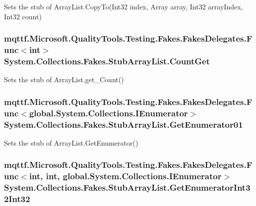 Sets the stub of Array\-List.\-Copy\-To(\-Int32 index, Array array, Int32 array\-Index, Int32 count)

\hypertarget{class_system_1_1_collections_1_1_fakes_1_1_stub_array_list_abc83a079c0d4b0bb23eccc981499f3ba}{
\subsubsection[{Count\-Get}]{\setlength{\rightskip}{0pt plus 5cm}mqttf.\-Microsoft.\-Quality\-Tools.\-Testing.\-Fakes.\-Fakes\-Delegates.\-Func$<$int$>$ System.\-Collections.\-Fakes.\-Stub\-Array\-List.\-Count\-Get}}\label{class_system_1_1_collections_1_1_fakes_1_1_stub_array_list_abc83a079c0d4b0bb23eccc981499f3ba}


Sets the stub of Array\-List.\-get\-\_\-\-Count()

\hypertarget{class_system_1_1_collections_1_1_fakes_1_1_stub_array_list_ad59c2061a3fc03484408b6dda5eafa56}{
\subsubsection[{Get\-Enumerator01}]{\setlength{\rightskip}{0pt plus 5cm}mqttf.\-Microsoft.\-Quality\-Tools.\-Testing.\-Fakes.\-Fakes\-Delegates.\-Func$<$global.\-System.\-Collections.\-I\-Enumerator$>$ System.\-Collections.\-Fakes.\-Stub\-Array\-List.\-Get\-Enumerator01}}\label{class_system_1_1_collections_1_1_fakes_1_1_stub_array_list_ad59c2061a3fc03484408b6dda5eafa56}


Sets the stub of Array\-List.\-Get\-Enumerator()

\hypertarget{class_system_1_1_collections_1_1_fakes_1_1_stub_array_list_a5fe28c5381dbe00f541af8334a2ca357}{
\subsubsection[{Get\-Enumerator\-Int32\-Int32}]{\setlength{\rightskip}{0pt plus 5cm}mqttf.\-Microsoft.\-Quality\-Tools.\-Testing.\-Fakes.\-Fakes\-Delegates.\-Func$<$int, int, global.\-System.\-Collections.\-I\-Enumerator$>$ System.\-Collections.\-Fakes.\-Stub\-Array\-List.\-Get\-Enumerator\-Int32\-Int32}}\label{class_system_1_1_collections_1_1_fakes_1_1_stub_array_list_a5fe28c5381dbe00f541af8334a2ca357}


